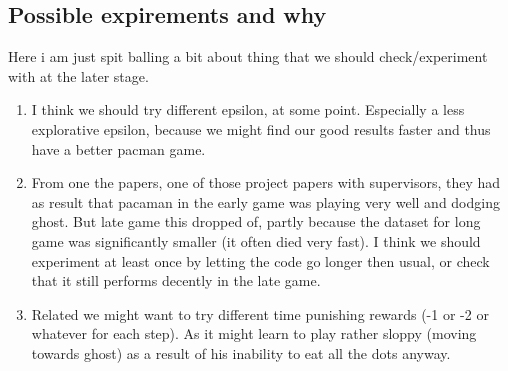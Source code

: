 \documentclass[a4paper]{article}
\begin{document}
\subsection{Possible expirements and why}
Here i am just spit balling a bit about thing that we should check/experiment with at the later stage.
\begin{enumerate}
\item I think we should try different epsilon, at some point. Especially a less explorative epsilon, because we might find our good results faster and thus have a better pacman game.
\item From one the papers, one of those project papers with supervisors, they had as result that pacaman in the early game was playing very well and dodging ghost. But late game this dropped of, partly because the dataset for long game was significantly smaller (it often died very fast). I think we should experiment at least once by letting the code go longer then usual, or check that it still performs decently in the late game.
\item Related we might want to try different time punishing rewards (-1 or -2 or whatever for each step). As it might learn to play rather sloppy (moving towards ghost) as a result of his inability to eat all the dots anyway.

\end{enumerate}
\end{document}
